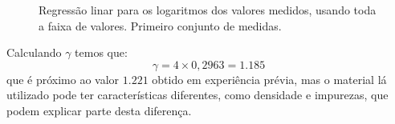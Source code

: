 \documentclass[brazilian,12pt,a4paper,final]{article}
\begin{document}
\begin{figure}[htbp!]
  \caption{Regressão linar para os logaritmos dos valores medidos, usando toda a faixa de valores. Primeiro conjunto de medidas.}
  \label{figfimgr}
  \centering
\end{figure}

Calculando $\gamma$ temos que:
$$\gamma=4\times 0,2963=1.185$$
que é próximo ao valor $1.221$ obtido em experiência prévia,
mas o material lá utilizado pode ter características diferentes,
como densidade e impurezas, que podem explicar parte desta diferença.
\end{document}
